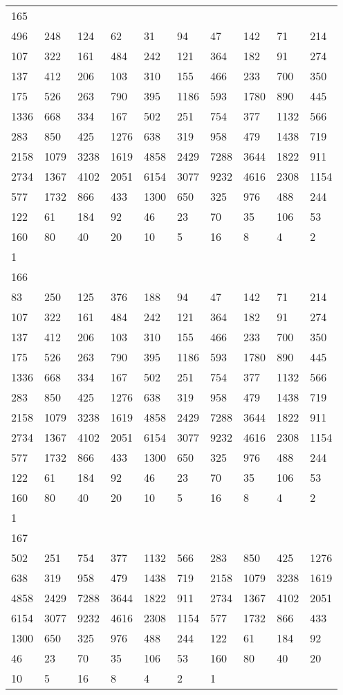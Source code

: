 \begin{longtable}{*{10}{l}}
165&&&&&&&&&\\
496& 248& 124& 62& 31& 94& 47& 142& 71& 214\\
107& 322& 161& 484& 242& 121& 364& 182& 91& 274\\
137& 412& 206& 103& 310& 155& 466& 233& 700& 350\\
175& 526& 263& 790& 395& 1186& 593& 1780& 890& 445\\
1336& 668& 334& 167& 502& 251& 754& 377& 1132& 566\\
283& 850& 425& 1276& 638& 319& 958& 479& 1438& 719\\
2158& 1079& 3238& 1619& 4858& 2429& 7288& 3644& 1822& 911\\
2734& 1367& 4102& 2051& 6154& 3077& 9232& 4616& 2308& 1154\\
577& 1732& 866& 433& 1300& 650& 325& 976& 488& 244\\
122& 61& 184& 92& 46& 23& 70& 35& 106& 53\\
160& 80& 40& 20& 10& 5& 16& 8& 4& 2\\
1& \\

166&&&&&&&&&\\
83& 250& 125& 376& 188& 94& 47& 142& 71& 214\\
107& 322& 161& 484& 242& 121& 364& 182& 91& 274\\
137& 412& 206& 103& 310& 155& 466& 233& 700& 350\\
175& 526& 263& 790& 395& 1186& 593& 1780& 890& 445\\
1336& 668& 334& 167& 502& 251& 754& 377& 1132& 566\\
283& 850& 425& 1276& 638& 319& 958& 479& 1438& 719\\
2158& 1079& 3238& 1619& 4858& 2429& 7288& 3644& 1822& 911\\
2734& 1367& 4102& 2051& 6154& 3077& 9232& 4616& 2308& 1154\\
577& 1732& 866& 433& 1300& 650& 325& 976& 488& 244\\
122& 61& 184& 92& 46& 23& 70& 35& 106& 53\\
160& 80& 40& 20& 10& 5& 16& 8& 4& 2\\
1& \\

167&&&&&&&&&\\
502& 251& 754& 377& 1132& 566& 283& 850& 425& 1276\\
638& 319& 958& 479& 1438& 719& 2158& 1079& 3238& 1619\\
4858& 2429& 7288& 3644& 1822& 911& 2734& 1367& 4102& 2051\\
6154& 3077& 9232& 4616& 2308& 1154& 577& 1732& 866& 433\\
1300& 650& 325& 976& 488& 244& 122& 61& 184& 92\\
46& 23& 70& 35& 106& 53& 160& 80& 40& 20\\
10& 5& 16& 8& 4& 2& 1& \\


\end{longtable}
